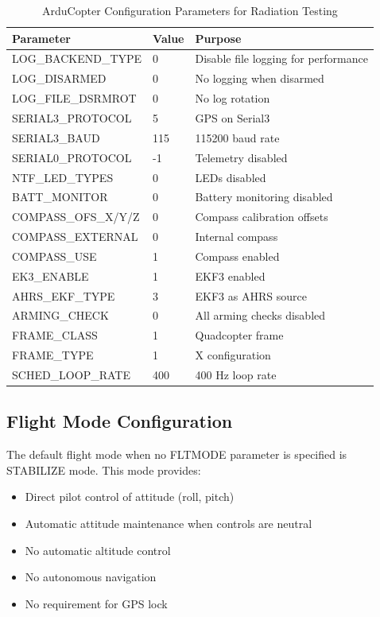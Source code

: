 \documentclass[11pt,a4paper]{article}
\begin{document}
\begin{table}[H]
\centering
\caption{ArduCopter Configuration Parameters for Radiation Testing}
\label{tab:config_params}
\begin{tabular}{@{}llp{6cm}@{}}
\toprule
\textbf{Parameter} & \textbf{Value} & \textbf{Purpose} \\
\midrule
LOG\_BACKEND\_TYPE & 0 & Disable file logging for performance \\
LOG\_DISARMED & 0 & No logging when disarmed \\
LOG\_FILE\_DSRMROT & 0 & No log rotation \\
SERIAL3\_PROTOCOL & 5 & GPS on Serial3 \\
SERIAL3\_BAUD & 115 & 115200 baud rate \\
SERIAL0\_PROTOCOL & -1 & Telemetry disabled \\
NTF\_LED\_TYPES & 0 & LEDs disabled \\
BATT\_MONITOR & 0 & Battery monitoring disabled \\
COMPASS\_OFS\_X/Y/Z & 0 & Compass calibration offsets \\
COMPASS\_EXTERNAL & 0 & Internal compass \\
COMPASS\_USE & 1 & Compass enabled \\
EK3\_ENABLE & 1 & EKF3 enabled \\
AHRS\_EKF\_TYPE & 3 & EKF3 as AHRS source \\
ARMING\_CHECK & 0 & All arming checks disabled \\
FRAME\_CLASS & 1 & Quadcopter frame \\
FRAME\_TYPE & 1 & X configuration \\
SCHED\_LOOP\_RATE & 400 & 400 Hz loop rate \\
\bottomrule
\end{tabular}
\end{table}

\subsection{Flight Mode Configuration}

The default flight mode when no FLTMODE parameter is specified is STABILIZE mode. This mode provides:

\begin{itemize}
  \item Direct pilot control of attitude (roll, pitch)
  \item Automatic attitude maintenance when controls are neutral
  \item No automatic altitude control
  \item No autonomous navigation
  \item No requirement for GPS lock
\end{itemize}
\end{document}
